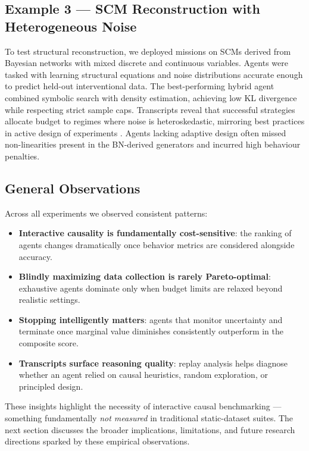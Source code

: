 \subsection{Example 3 — SCM Reconstruction with Heterogeneous Noise}
To test structural reconstruction, we deployed missions on SCMs derived from Bayesian networks with mixed discrete and continuous variables. Agents were tasked with learning structural equations and noise distributions accurate enough to predict held-out interventional data.  
The best-performing hybrid agent combined symbolic search with density estimation, achieving low KL divergence while respecting strict sample caps.  
Transcripts reveal that successful strategies allocate budget to regimes where noise is heteroskedastic, mirroring best practices in active design of experiments \citep{Seitzer2021CausalIDA,Mehrjou2020CausalCRA}. Agents lacking adaptive design often missed non-linearities present in the BN-derived generators and incurred high behaviour penalties.

\subsection{General Observations}
Across all experiments we observed consistent patterns:
\begin{itemize}
    \item \textbf{Interactive causality is fundamentally cost-sensitive}: the ranking of agents changes dramatically once behavior metrics are considered alongside accuracy.
    \item \textbf{Blindly maximizing data collection is rarely Pareto-optimal}: exhaustive agents dominate only when budget limits are relaxed beyond realistic settings.
    \item \textbf{Stopping intelligently matters}: agents that monitor uncertainty and terminate once marginal value diminishes consistently outperform in the composite score.
    \item \textbf{Transcripts surface reasoning quality}: replay analysis helps diagnose whether an agent relied on causal heuristics, random exploration, or principled design.
\end{itemize}

\medskip
These insights highlight the necessity of interactive causal benchmarking — something fundamentally \emph{not measured} in traditional static-dataset suites. The next section discusses the broader implications, limitations, and future research directions sparked by these empirical observations.
